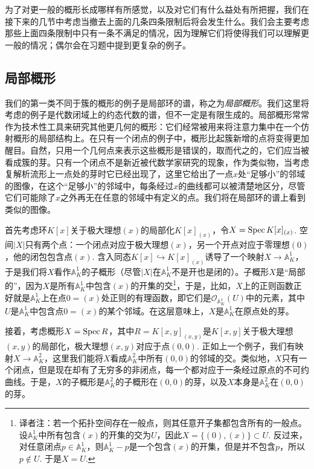 为了对更一般的概形长成哪样有所感觉，以及对它们有什么益处有所把握，我们在接下来的几节中考虑当撤去上面的几条四条限制后将会发生什么。我们会主要考虑那些上面四条限制中只有一条不满足的情况，因为理解它们将使得我们可以理解更一般的情况；偶尔会在习题中提到更复杂的例子。

\subsection{局部概形}

我们的第一类不同于簇的概形的例子是局部环的谱，称之为\textit{局部概形}。我们这里将考虑的例子是代数闭域上的约态代数的谱，但不一定是有限生成的。局部概形常常作为技术性工具来研究其他更几何的概形：它们经常被用来将注意力集中在一个仿射概形的局部结构上。在只有一个闭点的例子中，概形比起簇新增的点将变得更加醒目。自然，只用一个几何点来表示这些概形是错误的，取而代之的，它们应当被看成簇的芽。只有一个闭点不是新近被代数学家研究的现象，作为类似物，当考虑复解析流形上一点处的芽时它已经出现了，这里它给出了一点$x$处“足够小”的邻域的图像，在这个“足够小”的邻域中，每条经过$x$的曲线都可以被清楚地区分，尽管它们可能除了$x$之外再无在任意的邻域中有定义的点。我们将在局部环的谱上看到类似的图像。

首先考虑环$K[x]$关于极大理想$(x)$的局部化$K[x]_{(x)}$，令$X=\operatorname{Spec} K[x]_{(x)}$. 空间$|X|$只有两个点：一个闭点对应于极大理想$(x)$，另一个开点对应于零理想$(0)$，他的闭包包含点$(x)$. 含入同态$K[x]\hookrightarrow K[x]_{(x)}$诱导了一个映射$X\to \mathbb{A}_K^1$，于是我们将$X$看作$\mathbb{A}_K^1$的子概形（尽管$|X|$在$\mathbb{A}_K^1$不是开也是闭的）。子概形$X$是“局部的”，因为$X$是所有$\mathbb{A}_K^1$中包含$(x)$的开集的交\footnote{译者注：若一个拓扑空间存在一般点，则其任意开子集都包含所有的一般点。设$\mathbb{A}_K^1$中所有包含$(x)$的开集的交为$U$，因此$X=\{(0),(x)\}\subset U$. 反过来，对任意闭点$p\in \mathbb{A}_K^1$，则$\mathbb{A}_K^1-p$是一个包含$(x)$的开集，但是并不包含$p$，所以$p\not\in U$. 于是$X=U$.}，于是，比如，$X$上的正则函数正好就是$\mathbb{A}_K^1$上在点$0=(x)$处正则的有理函数，即它们是$\mathscr{O}_{\mathbb{A}_K^1}(U)$中的元素，其中$U$是$\mathbb{A}_K^1$中包含点$0=(x)$的某个邻域。在这层意味上，$X$是$\mathbb{A}_K^1$在原点处的芽。

接着，考虑概形$X=\operatorname{Spec} R$，其中$R=K[x,y]_{(x,y)}$是$K[x,y]$关于极大理想$(x,y)$的局部化，极大理想$(x,y)$对应于点$(0,0)$. 正如上一个例子，我们有映射$X\to \mathbb{A}_K^2$，这里我们能将$X$看成$\mathbb{A}_K^2$中所有$(0,0)$的邻域的交。类似地，$X$只有一个闭点，但是现在却有了无穷多的非闭点，每一个都对应于一条经过原点的不可约曲线。于是，$X$的子概形是$\mathbb{A}_K^2$的子概形在$(0,0)$的芽，以及$X$本身是$\mathbb{A}_K^2$在$(0,0)$的芽。

